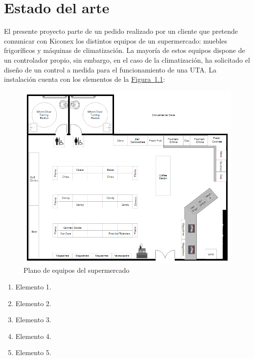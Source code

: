 
\cleardoublepage
\chapter{Estado del arte}

\label{chap:estadoArte} %

El presente proyecto parte de un pedido realizado por un cliente que pretende comunicar con Kiconex los distintos equipos de un supermercado: muebles frigoríficos y máquinas de climatización. La mayoría de estos equipos dispone de un controlador propio, sin embargo, en el caso de la climatización, ha solicitado el diseño de un control a medida para el funcionamiento de una UTA. La instalación cuenta con los elementos de la \hyperref[figura:planoSupermercado]{Figura~\ref{figura:planoSupermercado}}:

\begin{figure}[h]
  \centering
  \includegraphics[width=12cm, keepaspectratio]{img/planoSupermercado}
  \caption{Plano de equipos del supermercado}
  \label{figura:planoSupermercado}
\end{figure}

\begin{enumerate}
  \item Elemento 1.
  \item Elemento 2.
  \item Elemento 3.
  \item Elemento 4.
  \item Elemento 5.
\end{enumerate}

